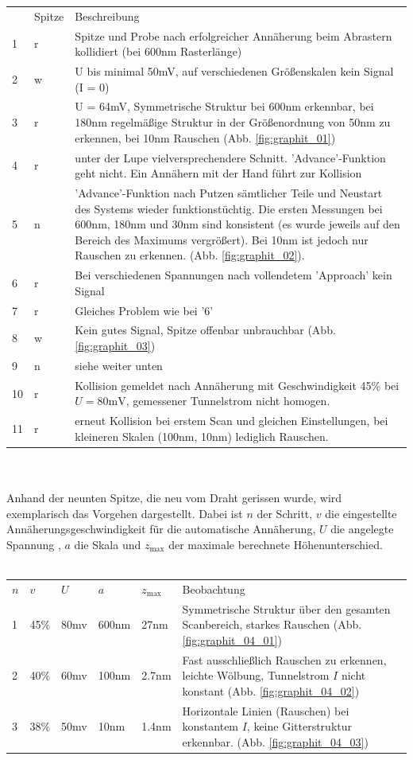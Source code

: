 \begin{tabular}{l l p{12cm}}
     & Spitze & Beschreibung \\
    1   & r & Spitze und Probe nach erfolgreicher Annäherung beim Abrastern 
kollidiert (bei 600nm Rasterlänge) \\
    2   & w & U bis minimal 50mV, auf verschiedenen Größenskalen kein Signal (I = 0) \\
    3   & r & U = 64mV, Symmetrische Struktur bei 600nm erkennbar, bei 180nm 
regelmäßige Struktur in der Größenordnung von 50nm zu erkennen, bei 10nm Rauschen 
(Abb. \ref{fig:graphit_01}) \\
    4   & r & unter der Lupe vielversprechendere Schnitt. 'Advance'-Funktion geht 
nicht. Ein Annähern mit der Hand führt zur Kollision \\
    5   & n & 'Advance'-Funktion nach Putzen sämtlicher Teile und Neustart des Systems wieder 
funktionstüchtig. Die ersten Messungen bei 600nm, 180nm und 30nm sind konsistent (es wurde 
jeweils auf den Bereich des Maximums vergrößert). Bei 10nm ist jedoch nur Rauschen zu erkennen.
(Abb. \ref{fig:graphit_02}). \\
    6   & r & Bei verschiedenen Spannungen nach vollendetem 'Approach' kein Signal \\
    7   & r & Gleiches Problem wie bei '6' \\
    8   & w & Kein gutes Signal, Spitze offenbar unbrauchbar
(Abb. \ref{fig:graphit_03}) \\
    9   & n & siehe weiter unten \\ 
   10   & r & Kollision gemeldet nach Annäherung mit Geschwindigkeit 45\% bei
$U = 80\mathrm{mV}$, gemessener Tunnelstrom nicht homogen. \\
   11   & r & erneut Kollision bei erstem Scan und gleichen Einstellungen, bei kleineren 
Skalen (100nm, 10nm) lediglich Rauschen.  \\
\end{tabular}
\\\\
Anhand der neunten Spitze, die neu vom Draht gerissen wurde,  wird exemplarisch das Vorgehen 
dargestellt. Dabei ist $n$ der Schritt, $v$ die eingestellte Annäherungsgeschwindigkeit für 
die automatische Annäherung, $U$ die angelegte Spannung , $a$ die Skala 
und $z_{\mathrm{max}}$ der maximale berechnete Höhenunterschied.
\\\\
\begin{tabular}{l l l l l p{8cm}}
$n$ & $v$ & $U$ & $a$ & $z_{\mathrm{max}}$ & Beobachtung \\
1   & 45\%  & 80mv  & 600nm & 27nm  & Symmetrische Struktur über den gesamten Scanbereich, 
starkes Rauschen 
(Abb. \ref{fig:graphit_04_01}) \\
2   & 40\%  & 60mv  & 100nm & 2.7nm  & Fast ausschließlich Rauschen zu erkennen, leichte 
Wölbung, Tunnelstrom $I$ nicht konstant 
(Abb. \ref{fig:graphit_04_02}) \\
3   & 38\%  & 50mv  & 10nm & 1.4nm  & Horizontale Linien (Rauschen) bei konstantem $I$, 
keine Gitterstruktur erkennbar.
(Abb. \ref{fig:graphit_04_03}) \\
\end{tabular}
